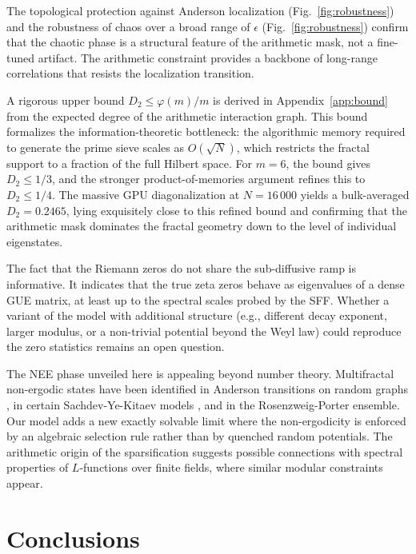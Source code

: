 \documentclass[aps,prl,preprint,superscriptaddress,floatfix]{revtex4-2}
\begin{document}
The topological protection against Anderson localization (Fig.~\ref{fig:robustness}) and the robustness of chaos over a broad range of $\epsilon$ (Fig.~\ref{fig:robustness}) confirm that the chaotic phase is a structural feature of the arithmetic mask, not a fine-tuned artifact. The arithmetic constraint provides a backbone of long-range correlations that resists the localization transition.

A rigorous upper bound $D_2 \le \varphi(m)/m$ is derived in Appendix~\ref{app:bound} from the expected degree of the arithmetic interaction graph. This bound formalizes the information-theoretic bottleneck: the algorithmic memory required to generate the prime sieve scales as $O(\sqrt{N})$, which restricts the fractal support to a fraction of the full Hilbert space. For $m=6$, the bound gives $D_2 \le 1/3$, and the stronger product-of-memories argument refines this to $D_2 \le 1/4$. The massive GPU diagonalization at $N=16\,000$ yields a bulk-averaged $D_2 = 0.2465$, lying exquisitely close to this refined bound and confirming that the arithmetic mask dominates the fractal geometry down to the level of individual eigenstates.

The fact that the Riemann zeros do not share the sub-diffusive ramp is informative. It indicates that the true zeta zeros behave as eigenvalues of a dense GUE matrix, at least up to the spectral scales probed by the SFF. Whether a variant of the model with additional structure (e.g., different decay exponent, larger modulus, or a non-trivial potential beyond the Weyl law) could reproduce the zero statistics remains an open question.

The NEE phase unveiled here is appealing beyond number theory. Multifractal non-ergodic states have been identified in Anderson transitions on random graphs \cite{Kravtsov2015}, in certain Sachdev-Ye-Kitaev models \cite{Legramandi2024}, and in the Rosenzweig-Porter ensemble. Our model adds a new exactly solvable limit where the non-ergodicity is enforced by an algebraic selection rule rather than by quenched random potentials. The arithmetic origin of the sparsification suggests possible connections with spectral properties of $L$-functions over finite fields, where similar modular constraints appear.

\section{Conclusions}
\end{document}
